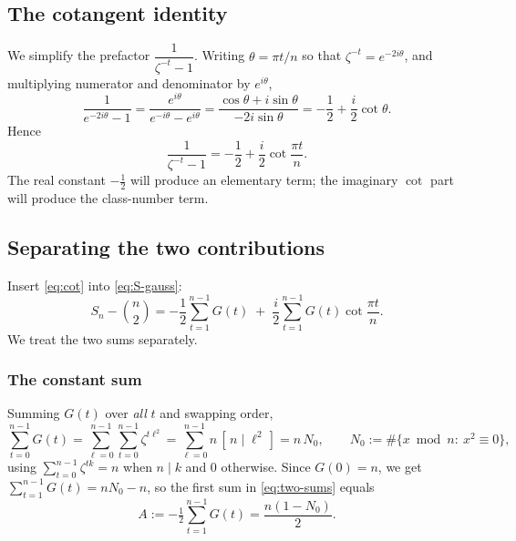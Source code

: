 \documentclass[11pt]{article}
\begin{document}
\subsection{The cotangent identity}
We simplify the prefactor $\dfrac{1}{\zeta^{-t}-1}$. Writing $\theta=\pi t/n$ so that $\zeta^{-t}=e^{-2i\theta}$,
and multiplying numerator and denominator by $e^{i\theta}$,
\[
\frac{1}{e^{-2i\theta}-1}=\frac{e^{i\theta}}{e^{-i\theta}-e^{i\theta}}=\frac{\cos\theta+i\sin\theta}{-2i\sin\theta}
=-\frac12+\frac{i}{2}\cot\theta.
\]
Hence
\begin{equation}\label{eq:cot}
\frac{1}{\zeta^{-t}-1}=-\frac12+\frac{i}{2}\cot\frac{\pi t}{n}.
\end{equation}
The real constant $-\tfrac12$ will produce an elementary term; the imaginary $\cot$ part will produce the
class-number term.

\subsection{Separating the two contributions}
Insert \eqref{eq:cot} into \eqref{eq:S-gauss}:
\begin{equation}\label{eq:two-sums}
S_n-\binom n2=-\frac12\sum_{t=1}^{n-1}G(t)\;+\;\frac{i}{2}\sum_{t=1}^{n-1}G(t)\cot\frac{\pi t}{n}.
\end{equation}
We treat the two sums separately.

\subsubsection*{The constant sum}
Summing $G(t)$ over \emph{all} $t$ and swapping order,
\[
\sum_{t=0}^{n-1}G(t)=\sum_{\ell=0}^{n-1}\sum_{t=0}^{n-1}\zeta^{t\ell^2}
=\sum_{\ell=0}^{n-1} n\,[\,n\mid \ell^2\,]=n\,N_0,\qquad N_0:=\#\{x\bmod n:\ x^2\equiv0\},
\]
using $\sum_{t=0}^{n-1}\zeta^{tk}=n$ when $n\mid k$ and $0$ otherwise. Since $G(0)=n$, we get
$\sum_{t=1}^{n-1}G(t)=nN_0-n$, so the first sum in \eqref{eq:two-sums} equals
\begin{equation}\label{eq:A}
A:=-\tfrac12\sum_{t=1}^{n-1}G(t)=\frac{n(1-N_0)}{2}.
\end{equation}
\end{document}
